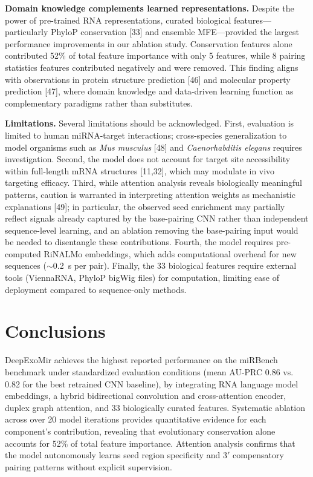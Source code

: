 \documentclass[sn-mathphys-num]{sn-jnl}
\begin{document}
\textbf{Domain knowledge complements learned representations.} Despite the power of pre-trained RNA representations, curated biological features---particularly PhyloP conservation [33] and ensemble MFE---provided the largest performance improvements in our ablation study. Conservation features alone contributed 52\% of total feature importance with only 5 features, while 8 pairing statistics features contributed negatively and were removed. This finding aligns with observations in protein structure prediction [46] and molecular property prediction [47], where domain knowledge and data-driven learning function as complementary paradigms rather than substitutes.

\textbf{Limitations.} Several limitations should be acknowledged. First, evaluation is limited to human miRNA-target interactions; cross-species generalization to model organisms such as \textit{Mus musculus} [48] and \textit{Caenorhabditis elegans} requires investigation. Second, the model does not account for target site accessibility within full-length mRNA structures [11,32], which may modulate in vivo targeting efficacy. Third, while attention analysis reveals biologically meaningful patterns, caution is warranted in interpreting attention weights as mechanistic explanations [49]; in particular, the observed seed enrichment may partially reflect signals already captured by the base-pairing CNN rather than independent sequence-level learning, and an ablation removing the base-pairing input would be needed to disentangle these contributions. Fourth, the model requires pre-computed RiNALMo embeddings, which adds computational overhead for new sequences ($\sim$0.2~s per pair). Finally, the 33 biological features require external tools (ViennaRNA, PhyloP bigWig files) for computation, limiting ease of deployment compared to sequence-only methods.


\section{Conclusions}\label{sec:conclusions}

DeepExoMir achieves the highest reported performance on the miRBench benchmark under standardized evaluation conditions (mean AU-PRC 0.86 vs. 0.82 for the best retrained CNN baseline), by integrating RNA language model embeddings, a hybrid bidirectional convolution and cross-attention encoder, duplex graph attention, and 33 biologically curated features. Systematic ablation across over 20 model iterations provides quantitative evidence for each component's contribution, revealing that evolutionary conservation alone accounts for 52\% of total feature importance. Attention analysis confirms that the model autonomously learns seed region specificity and 3$'$ compensatory pairing patterns without explicit supervision.
\end{document}
